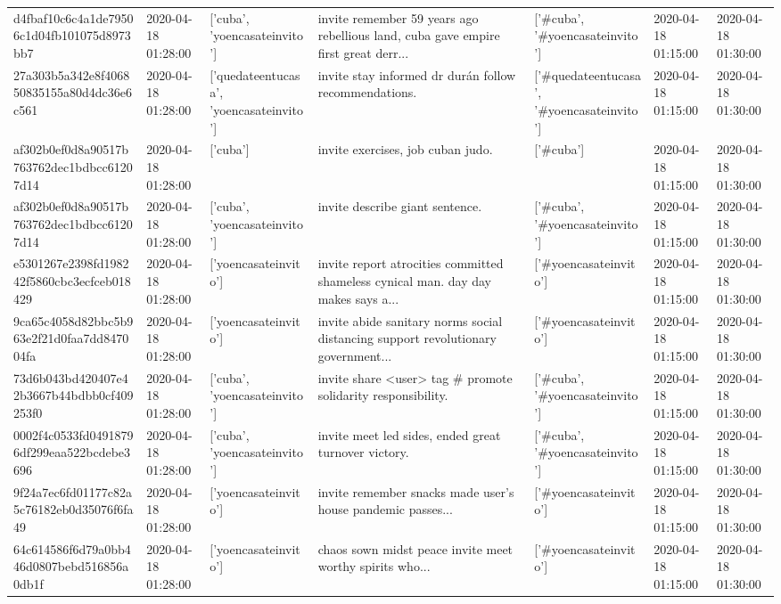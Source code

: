 \begin{tabular}{lllllll}
d4fbaf10c6c4a1de79506c1d04fb101075d8973bb7 & 2020-04-18 01:28:00 & ['cuba', 'yoencasateinvito'] & invite remember 59 years ago rebellious land, cuba gave empire first great derr... & ['#cuba', '#yoencasateinvito'] & 2020-04-18 01:15:00 & 2020-04-18 01:30:00 \\
27a303b5a342e8f406850835155a80d4dc36e6c561 & 2020-04-18 01:28:00 & ['quedateentucasa', 'yoencasateinvito'] & invite stay informed dr durán follow recommendations. & ['#quedateentucasa', '#yoencasateinvito'] & 2020-04-18 01:15:00 & 2020-04-18 01:30:00 \\
af302b0ef0d8a90517b763762dec1bdbcc61207d14 & 2020-04-18 01:28:00 & ['cuba'] & invite exercises, job cuban judo. & ['#cuba'] & 2020-04-18 01:15:00 & 2020-04-18 01:30:00 \\
af302b0ef0d8a90517b763762dec1bdbcc61207d14 & 2020-04-18 01:28:00 & ['cuba', 'yoencasateinvito'] & invite describe giant sentence. & ['#cuba', '#yoencasateinvito'] & 2020-04-18 01:15:00 & 2020-04-18 01:30:00 \\
e5301267e2398fd198242f5860cbc3ecfceb018429 & 2020-04-18 01:28:00 & ['yoencasateinvito'] & invite report atrocities committed shameless cynical man. day day makes says a... & ['#yoencasateinvito'] & 2020-04-18 01:15:00 & 2020-04-18 01:30:00 \\
9ca65c4058d82bbc5b963e2f21d0faa7dd847004fa & 2020-04-18 01:28:00 & ['yoencasateinvito'] & invite abide sanitary norms social distancing support revolutionary government... & ['#yoencasateinvito'] & 2020-04-18 01:15:00 & 2020-04-18 01:30:00 \\
73d6b043bd420407e42b3667b44bdbb0cf409253f0 & 2020-04-18 01:28:00 & ['cuba', 'yoencasateinvito'] & invite share <user> tag \# promote solidarity responsibility. & ['#cuba', '#yoencasateinvito'] & 2020-04-18 01:15:00 & 2020-04-18 01:30:00 \\
0002f4c0533fd04918796df299eaa522bcdebe3696 & 2020-04-18 01:28:00 & ['cuba', 'yoencasateinvito'] & invite meet led sides, ended great turnover victory. & ['#cuba', '#yoencasateinvito'] & 2020-04-18 01:15:00 & 2020-04-18 01:30:00 \\
9f24a7ec6fd01177c82a5c76182eb0d35076f6fa49 & 2020-04-18 01:28:00 & ['yoencasateinvito'] & invite remember snacks made user's house pandemic passes... & ['#yoencasateinvito'] & 2020-04-18 01:15:00 & 2020-04-18 01:30:00 \\
64c614586f6d79a0bb446d0807bebd516856a0db1f & 2020-04-18 01:28:00 & ['yoencasateinvito'] & chaos sown midst peace invite meet worthy spirits who... & ['#yoencasateinvito'] & 2020-04-18 01:15:00 & 2020-04-18 01:30:00 \\

\end{tabular}

